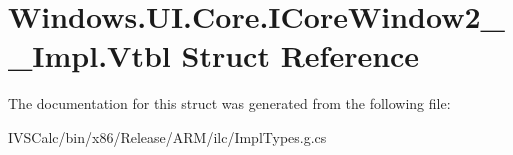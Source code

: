\hypertarget{struct_windows_1_1_u_i_1_1_core_1_1_i_core_window2_____impl_1_1_vtbl}{}\section{Windows.\+U\+I.\+Core.\+I\+Core\+Window2\+\_\+\+\_\+\+Impl.\+Vtbl Struct Reference}
\label{struct_windows_1_1_u_i_1_1_core_1_1_i_core_window2_____impl_1_1_vtbl}


The documentation for this struct was generated from the following file\+:\begin{DoxyCompactItemize}
\item 
I\+V\+S\+Calc/bin/x86/\+Release/\+A\+R\+M/ilc/Impl\+Types.\+g.\+cs\end{DoxyCompactItemize}
